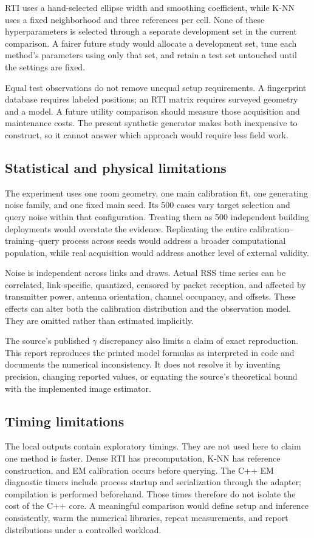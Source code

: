 \documentclass[conference,letterpaper]{IEEEtran}
\begin{document}
RTI uses a hand-selected ellipse width and smoothing coefficient, while K-NN uses a fixed neighborhood and three references per cell. None of these hyperparameters is selected through a separate development set in the current comparison. A fairer future study would allocate a development set, tune each method's parameters using only that set, and retain a test set untouched until the settings are fixed.

Equal test observations do not remove unequal setup requirements. A fingerprint database requires labeled positions; an RTI matrix requires surveyed geometry and a model. A future utility comparison should measure those acquisition and maintenance costs. The present synthetic generator makes both inexpensive to construct, so it cannot answer which approach would require less field work.

\subsection{Statistical and physical limitations}
The experiment uses one room geometry, one main calibration fit, one generating noise family, and one fixed main seed. Its 500 cases vary target selection and query noise within that configuration. Treating them as 500 independent building deployments would overstate the evidence. Replicating the entire calibration--training--query process across seeds would address a broader computational population, while real acquisition would address another level of external validity.

Noise is independent across links and draws. Actual RSS time series can be correlated, link-specific, quantized, censored by packet reception, and affected by transmitter power, antenna orientation, channel occupancy, and offsets. These effects can alter both the calibration distribution and the observation model. They are omitted rather than estimated implicitly.

The source's published $\gamma$ discrepancy also limits a claim of exact reproduction. This report reproduces the printed model formulas as interpreted in code and documents the numerical inconsistency. It does not resolve it by inventing precision, changing reported values, or equating the source's theoretical bound with the implemented image estimator.

\subsection{Timing limitations}
The local outputs contain exploratory timings. They are not used here to claim one method is faster. Dense RTI has precomputation, K-NN has reference construction, and EM calibration occurs before querying. The C++ EM diagnostic timers include process startup and serialization through the adapter; compilation is performed beforehand. Those times therefore do not isolate the cost of the C++ core. A meaningful comparison would define setup and inference consistently, warm the numerical libraries, repeat measurements, and report distributions under a controlled workload.
\end{document}
